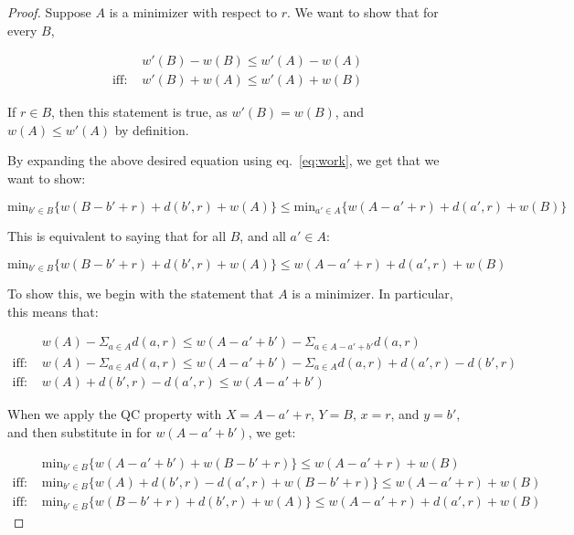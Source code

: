 \begin{proof}
    Suppose $A$ is a minimizer with respect to $r$. We want to show that for every $B$,

    \begin{equation*}
        \begin{split}
            &w'(B) - w(B) \leq w'(A) - w(A) \\
            \text{iff: }&w'(B) + w(A) \leq w'(A) + w(B)
        \end{split}
    \end{equation*}

    If $r \in B$, then this statement is true, as $w'(B) = w(B)$, and $w(A) \leq w'(A)$ by definition.

    By expanding the above desired equation using eq.~\eqref{eq:work}, we get that we want to show:

    \begin{equation*}
        \mathrm{min}_{b' \in B} \{ w(B - b' + r) + d(b', r) + w(A)\} \leq \mathrm{min}_{a' \in A} \{ w(A - a' + r) + d(a', r) + w(B)\}
    \end{equation*}

    This is equivalent to saying that for all $B$, and all $a' \in A$: 

    \begin{equation*}
        \mathrm{min}_{b' \in B} \{ w(B - b' + r) + d(b', r) + w(A)\} \leq w(A - a' + r) + d(a', r) + w(B)
    \end{equation*}

    To show this, we begin with the statement that $A$ is a minimizer. In particular, this means that:

    \begin{equation*}
        \begin{split}
            &w(A) - \Sigma_{a \in A} d(a,r) \leq w(A -a' + b') - \Sigma_{a \in A - a' + b'} d(a,r) \\
            \text{iff: }&w(A) - \Sigma_{a \in A} d(a,r) \leq w(A -a' + b') - \Sigma_{a \in A} d(a,r) + d(a', r) - d(b', r) \\
            \text{iff: }&w(A) + d(b', r) - d(a', r) \leq w(A - a' + b')
        \end{split}
    \end{equation*}

    When we apply the QC property with $X = A - a' + r$, $Y = B$, $x = r$, and $y = b'$, and then substitute in for $w(A - a' + b')$, we get:

    \begin{equation*}
        \begin{split}
            &\mathrm{min}_{b' \in B} \{ w(A - a' + b') + w(B - b' + r)\} \leq w(A - a' + r) + w(B) \\
            \text{iff: }&\mathrm{min}_{b' \in B} \{ w(A) + d(b', r) - d(a', r) + w(B - b' + r)\}\leq w(A - a' + r) + w(B) \\
            \text{iff: }&\mathrm{min}_{b' \in B} \{ w(B - b' + r) + d(b', r) + w(A)\} \leq w(A - a' + r) + d(a', r) + w(B)
        \end{split}
    \end{equation*}
\end{proof}

